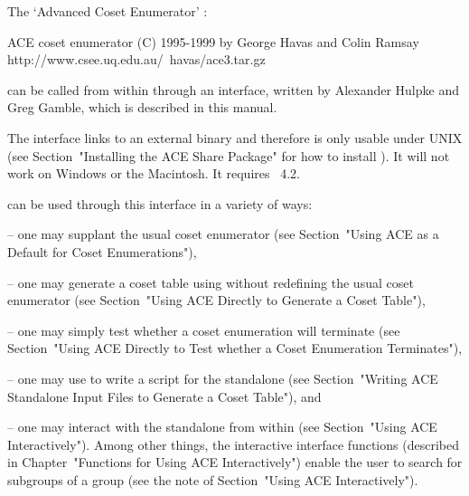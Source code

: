 

The \lq{}Advanced Coset Enumerator' {\ACE}:

\begintt
ACE coset enumerator (C) 1995-1999 by George Havas and Colin Ramsay
    http://www.csee.uq.edu.au/~havas/ace3.tar.gz
\endtt

can  be called  from within  {\GAP} through  an interface,  written by
Alexander Hulpke and Greg Gamble, which is described in this manual.

The interface links to an external binary and therefore is only usable
under UNIX (see Section~"Installing the ACE Share Package" for how  to
install {\ACE}).  It will not work  on  Windows  or the Macintosh.  It
requires {\GAP}~4.2.

{\ACE} can be used through this interface in a variety  of  ways:

\beginlist

\item{--} one may supplant the  usual  {\GAP}  coset  enumerator  (see
Section~"Using ACE as a Default for Coset Enumerations"),

\item{--}  one  may  generate  a  coset  table  using  {\ACE}  without
redefining the usual {\GAP} coset enumerator (see  Section~"Using  ACE
Directly to Generate a Coset Table"),

\item{--} one  may  simply  test  whether  a  coset  enumeration  will
terminate (see Section~"Using ACE Directly to  Test  whether  a  Coset
Enumeration Terminates"),

\item{--} one may  use  {\GAP}  to  write  a  script  for  the  {\ACE}
standalone  (see  Section~"Writing  ACE  Standalone  Input  Files   to
Generate a Coset Table"), and

\item{--} one may interact with  the  {\ACE}  standalone  from  within
{\GAP} (see Section~"Using ACE Interactively").  Among  other  things,
the   interactive   {\ACE}   interface   functions    (described    in
Chapter~"Functions for Using ACE Interactively") enable  the  user  to
search for subgroups of a group (see the note  of  Section~"Using  ACE
Interactively").

